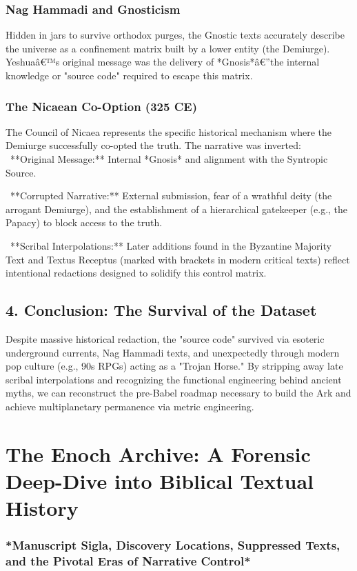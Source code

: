 \documentclass[aps,prd,11pt,onecolumn,superscriptaddress,nofootinbib,floatfix]{revtex4-2}
\begin{document}
\subsubsection{Nag Hammadi and Gnosticism}
Hidden in jars to survive orthodox purges, the Gnostic texts accurately describe the universe as a confinement matrix built by a lower entity (the Demiurge). Yeshuaâ€™s original message was the delivery of *Gnosis*â€''the internal knowledge or "source code" required to escape this matrix.


\subsubsection{The Nicaean Co-Option (325 CE)}
The Council of Nicaea represents the specific historical mechanism where the Demiurge successfully co-opted the truth. The narrative was inverted:
\textbullet~**Original Message:** Internal *Gnosis* and alignment with the Syntropic Source.

\textbullet~**Corrupted Narrative:** External submission, fear of a wrathful deity (the arrogant Demiurge), and the establishment of a hierarchical gatekeeper (e.g., the Papacy) to block access to the truth.

\textbullet~**Scribal Interpolations:** Later additions found in the Byzantine Majority Text and Textus Receptus (marked with brackets in modern critical texts) reflect intentional redactions designed to solidify this control matrix.



\subsection{4. Conclusion: The Survival of the Dataset}
Despite massive historical redaction, the "source code" survived via esoteric underground currents, Nag Hammadi texts, and unexpectedly through modern pop culture (e.g., 90s RPGs) acting as a "Trojan Horse." By stripping away late scribal interpolations and recognizing the functional engineering behind ancient myths, we can reconstruct the pre-Babel roadmap necessary to build the Ark and achieve multiplanetary permanence via metric engineering.
\section{The Enoch Archive: A Forensic Deep-Dive into Biblical Textual History}
\subsubsection{*Manuscript Sigla, Discovery Locations, Suppressed Texts, and the Pivotal Eras of Narrative Control*}
\end{document}
